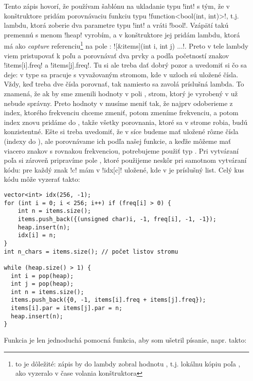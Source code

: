 Tento zápis hovorí, že používam šablónu na ukladanie typu \prg!int! s tým,
že v konštruktore pridám porovnávaciu funkciu typu \prg!function<bool(int, int)>!,
t.j. lambdu, ktorá zoberie dva parametre typu \prg!int! a vráti \prg!bool!.
Vzápätí takú premennú s menom \prg!heap! vyrobím, a v konštruktore 
jej pridám lambdu, ktorá má ako {\em capture} referenciu\footnote{%
  to je dôležité: zápis  by do lambdy
zobral hodnotu , t.j. 
lokálnu kópiu poľa , ako vyzeralo v čase volania konštruktora}
  na pole :
\prg![&items](int i, int j) {...}!. Preto v tele lambdy viem pristupovať k poľu
 a porovnávať dva prvky  a  podľa početností znakov
\prg!items[i].freq! a \prg!items[j].freq!. Tu si ale treba dať dobrý pozor a uvedomiť si
čo sa deje: v type  sa pracuje s vyvažovaným stromom, kde v uzloch sú uložené
čísla. Vždy, keď treba dve čísla porovnať, tak namiesto \vb{<} sa zavolá príslušná
lambda. To znamená, že ak by sme zmenili hodnoty  v poli , strom, 
ktorý je vyrobený v  už nebude správny. Preto hodnoty v  musíme 
meniť tak, že najprv odoberieme z  index, ktorého frekvenciu chceme zmeniť,
potom zmeníme frekvenciu, a potom index znovu pridáme do , takže všetky porovnania,
ktoré sa v strome  robia, budú konzistentné. Ešte si treba uvedomiť, 
že v  síce budeme mať uložené rôzne čísla (indexy do ), ale 
porovnávame ich podľa našej funkcie, a keďže môžeme mať viacero znakov s rovnakou
frekvenciou, potrebujeme použiť typ . Pri vytváraní poľa 
si zároveň pripravíme pole , ktoré použijeme neskôr pri samotnom vytváraní kódu:
pre každý znak \prg!c! mám v \prg!idx[c]! uložené, kde v  je príslušný list.
Celý kus kódu môže vyzerať takto:

\begin{lstlisting}
vector<int> idx(256, -1);
for (int i = 0; i < 256; i++) if (freq[i] > 0) {
    int n = items.size();
    items.push_back({(unsigned char)i, -1, freq[i], -1, -1});
    heap.insert(n);
    idx[i] = n;
}
int n_chars = items.size(); // počet listov stromu

while (heap.size() > 1) {
  int i = pop(heap);
  int j = pop(heap);
  int n = items.size();
  items.push_back({0, -1, items[i].freq + items[j].freq});
  items[i].par = items[j].par = n;
  heap.insert(n);
}
\end{lstlisting}


Funkcia  je len jednoduchá pomocná funkcia, aby som ušetril písanie, napr. takto:

